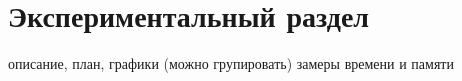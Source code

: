 \chapter{Экспериментальный раздел}
\label{cha:research}
    описание, план, графики (можно групировать)
    замеры времени и памяти
\newpage